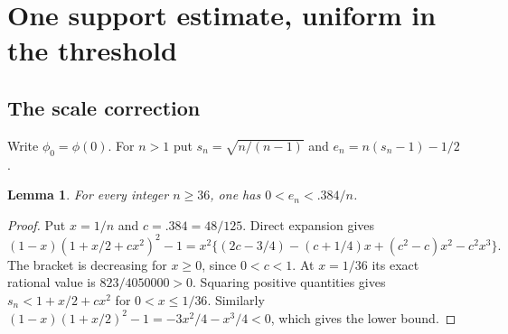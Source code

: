 \documentclass[11pt,a4paper]{article}
\numberwithin{equation}{section}
\newtheorem{lemma}[theorem]{Lemma}
\theoremstyle{definition}
\theoremstyle{remark}
\begin{document}
\section{One support estimate, uniform in the threshold}\label{cut49:support:theorem}
\subsection{The scale correction}
Write $\phi_0=\phi(0)$.
For $n>1$ put $s_n=\sqrt{n/(n-1)}$ and
$e_n=n(s_n-1)-1/2$.
\begin{lemma}\label{cut49:support:scale}
For every integer $n\ge36$, one has $0<e_n<.384/n$.
\end{lemma}
\begin{proof}
Put $x=1/n$ and $c=.384=48/125$. Direct expansion gives
\[
 (1-x)(1+x/2+cx^2)^2-1
 =x^2\{(2c-3/4)-(c+1/4)x+(c^2-c)x^2-c^2x^3\}.
\]
The bracket is decreasing for $x\ge0$, since $0<c<1$.
At $x=1/36$ its exact rational value is $823/4050000>0$.
Squaring positive quantities gives
$s_n<1+x/2+cx^2$ for $0<x\le1/36$. Similarly
$(1-x)(1+x/2)^2-1=-3x^2/4-x^3/4<0$, which gives the lower bound.
\end{proof}
\end{document}
